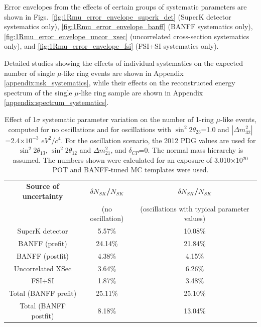 Error envelopes from the effects of certain groups of systematic parameters are shown in  
Figs.\ \ref{fig:1Rmu_error_envelope_superk_det} (SuperK detector systematics only), 
\ref{fig:1Rmu_error_envelope_banff} (BANFF systematics only), 
\ref{fig:1Rmu_error_envelope_uncor_xsec} (uncorrelated cross-section systematics only), and 
\ref{fig:1Rmu_error_envelope_fsi} (FSI+SI systematics only).

Detailed studies showing the effects of individual systematics on the expected number of
single $\mu$-like ring events are shown in Appendix \ref{appendix:nsk_systematics},
while their effects on the reconstructed energy spectrum of the single $\mu$-like ring sample
are shown in Appendix \ref{appendix:spectrum_systematics}.


\begin{table}
\centering
\begin{tabular}{| c | c | c |}
\hline
  {\bf Source of uncertainty}  &  {\bf ${\delta}N_{SK}$/$N_{SK}$}  & {\bf ${\delta}N_{SK}$/$N_{SK}$} \\
                               &  (no oscillation)                 & (oscillations with typical parameter values) \\
\hline
SuperK detector       &  5.57\%   & 10.08\%  \\
BANFF (prefit)        & 24.14\%   & 21.84\%  \\
BANFF (postfit)       &  4.38\%   &  4.15\%  \\
Uncorrelated XSec     &  3.64\%   &  6.26\%  \\
FSI+SI                &  1.87\%   &  3.48\%  \\
\hline
Total (BANFF prefit)  & 25.11\%   & 25.10\%  \\
Total (BANFF postfit) &  8.18\%   & 13.04\%  \\
\hline
\end{tabular}
\caption{
  Effect of 1$\sigma$ systematic parameter variation on
  the number of 1-ring $\mu$-like events,
  computed
  for no oscillations and
  for oscillations with 
  $\sin^{2}2\theta_{23}$=1.0 and $|\Delta m^{2}_{32}|$=2.4$\times10^{-3}$ $eV^{2}/c^{4}$.
  For the oscillation scenario, the 2012 PDG values are used for $\sin^{2}2\theta_{13}$, $\sin^{2}2\theta_{12}$ and $\Delta m^{2}_{21}$,
  and $\delta_{CP}$=0. The normal mass hierarchy is assumed.
  The numbers shown were calculated for an exposure of 3.010$\times$10$^{20}$ POT and BANFF-tuned MC templates were used.
}
\label{tab:nsk_systematic_table_summary}
\end{table}

